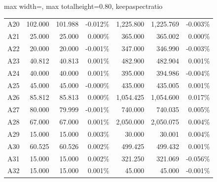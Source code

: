 \begin{table}[H]
\begin{adjustbox}{max width=\textwidth, max totalheight=0.80\textheight, keepaspectratio}
\begin{tabular}{@{}lrrrrrr@{}}
A20 & 102.000 & 101.988 & -0.012\% & 1,225.800 & 1,225.769 & -0.003\% \\
A21 & 25.000 & 25.000 & 0.000\% & 365.000 & 365.002 & 0.000\% \\
A22 & 20.000 & 20.000 & -0.001\% & 347.000 & 346.990 & -0.003\% \\
A23 & 40.812 & 40.813 & 0.001\% & 482.900 & 482.904 & 0.001\% \\
A24 & 40.000 & 40.000 & 0.001\% & 395.000 & 394.986 & -0.004\% \\
A25 & 45.000 & 45.000 & -0.000\% & 435.000 & 435.005 & 0.001\% \\
A26 & 85.812 & 85.813 & 0.000\% & 1,054.425 & 1,054.600 & 0.017\% \\
A27 & 80.000 & 79.999 & -0.001\% & 740.000 & 740.035 & 0.005\% \\
A28 & 67.000 & 67.000 & 0.001\% & 2,050.000 & 2,050.075 & 0.004\% \\
A29 & 15.000 & 15.000 & 0.003\% & 30.000 & 30.001 & 0.004\% \\
A30 & 60.525 & 60.526 & 0.002\% & 499.425 & 499.432 & 0.001\% \\
A31 & 15.000 & 15.000 & 0.002\% & 321.250 & 321.069 & -0.056\% \\
A32 & 15.000 & 15.000 & 0.001\% & 45.000 & 45.000 & -0.001\% \\
\bottomrule
\end{tabular}
\end{adjustbox}
\end{table}
